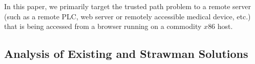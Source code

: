 


In this paper, we primarily target the trusted path problem to a remote server (such as a remote PLC, web server or remotely accessible medical device, etc.) that is being accessed from a browser running on a commodity $x86$ host.


\subsection{Analysis of Existing and Strawman Solutions}
\label{sec:problemStatement:existingSolution}



